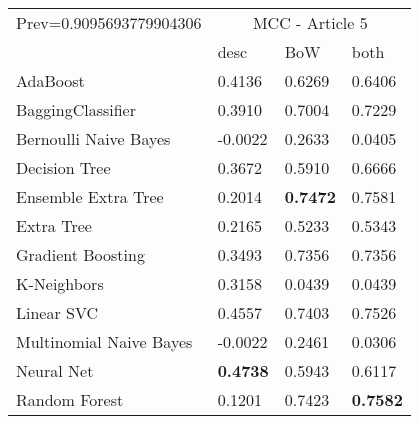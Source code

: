 \begin{tabular}{|l|l|l|l| }
\hline
Prev=0.9095693779904306 &  \multicolumn{3}{c|}{MCC - Article 5} \\
\cline{2-4} & desc & BoW & both \\ \hline
AdaBoost                & 0.4136 & 0.6269 & 0.6406\\
BaggingClassifier       & 0.3910 & 0.7004 & 0.7229\\
Bernoulli Naive Bayes   & -0.0022 & 0.2633 & 0.0405\\
Decision Tree           & 0.3672 & 0.5910 & 0.6666\\
Ensemble Extra Tree     & 0.2014 & {\bf 0.7472} & 0.7581\\
Extra Tree              & 0.2165 & 0.5233 & 0.5343\\
Gradient Boosting       & 0.3493 & 0.7356 & 0.7356\\
K-Neighbors             & 0.3158 & 0.0439 & 0.0439\\
Linear SVC              & 0.4557 & 0.7403 & 0.7526\\
Multinomial Naive Bayes & -0.0022 & 0.2461 & 0.0306\\
Neural Net              & {\bf 0.4738} & 0.5943 & 0.6117\\
Random Forest           & 0.1201 & 0.7423 & {\bf 0.7582}\\
\hline
\end{tabular}